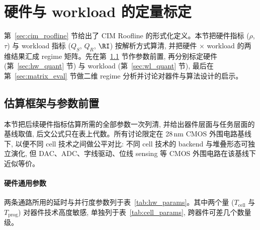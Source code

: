 \section{硬件与 workload 的定量标定}
\label{sec:quantitative}

第~\ref{sec:cim_roofline} 节给出了 CIM Roofline 的形式化定义。本节把硬件指标 ($\rho$, $\tau$) 与 workload 指标 ($Q_S$, $Q_R$, $\RI$) 按解析方式算清, 并把硬件 $\times$ workload 的两维结果汇成 regime 矩阵。先在第~\ref{sec:assumptions} 节作参数前置, 再分别标定硬件 (第~\ref{sec:hw_quant} 节) 与 workload (第~\ref{sec:wl_quant} 节), 最后在第~\ref{sec:matrix_eval} 节做二维 regime 分析并讨论对器件与算法设计的启示。

\subsection{估算框架与参数前置}
\label{sec:assumptions}

本节把后续硬件指标估算所需的全部参数一次列清, 并给出器件层面与任务层面的基线取值, 后文公式只在表上代数。所有讨论限定在 28\,nm CMOS 外围电路基线下, 以便不同 cell 技术之间做公平对比: 不同 cell 技术的 backend 与堆叠形态可独立演化, 但 DAC、ADC、字线驱动、位线 sensing 等 CMOS 外围电路在该基线下近似等价。

\paragraph{硬件通用参数}
两条通路所用的延时与并行度参数列于表~\ref{tab:hw_params}。其中两个量 ($T_{\mathrm{cell}}$ 与 $T_{\mathrm{prog}}$) 对器件技术高度敏感, 单独列于表~\ref{tab:cell_params}, 跨器件可差几个数量级。

